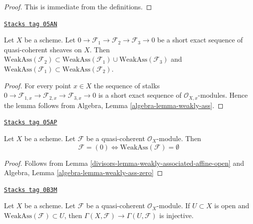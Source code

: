 \begin{proof}
This is immediate from the definitions.
\end{proof}

\begin{lemma}
\label{divisors-lemma-ses-weakly-ass}
\href{https://stacks.math.columbia.edu/tag/05AN}{\texttt{Stacks tag 05AN}}

Let $X$ be a scheme.
Let $0 \to \mathcal{F}_1 \to \mathcal{F}_2 \to \mathcal{F}_3 \to 0$
be a short exact sequence of quasi-coherent sheaves on $X$.
Then
$\text{WeakAss}(\mathcal{F}_2) \subset
\text{WeakAss}(\mathcal{F}_1) \cup \text{WeakAss}(\mathcal{F}_3)$
and
$\text{WeakAss}(\mathcal{F}_1) \subset \text{WeakAss}(\mathcal{F}_2)$.
\end{lemma}

\begin{proof}
For every point $x \in X$ the sequence of stalks
$0 \to \mathcal{F}_{1, x} \to \mathcal{F}_{2, x} \to \mathcal{F}_{3, x} \to 0$
is a short exact sequence of $\mathcal{O}_{X, x}$-modules.
Hence the lemma follows from
Algebra, Lemma \ref{algebra-lemma-weakly-ass}.
\end{proof}

\begin{lemma}
\label{divisors-lemma-weakly-ass-zero}
\href{https://stacks.math.columbia.edu/tag/05AP}{\texttt{Stacks tag 05AP}}

Let $X$ be a scheme.
Let $\mathcal{F}$ be a quasi-coherent $\mathcal{O}_X$-module.
Then
$$
\mathcal{F} = (0) \Leftrightarrow \text{WeakAss}(\mathcal{F}) = \emptyset
$$
\end{lemma}

\begin{proof}

Follows from
Lemma \ref{divisors-lemma-weakly-associated-affine-open}
and
Algebra, Lemma \ref{algebra-lemma-weakly-ass-zero}
\end{proof}

\begin{lemma}
\label{divisors-lemma-restriction-injective-open-contains-weakly-ass}
\href{https://stacks.math.columbia.edu/tag/0B3M}{\texttt{Stacks tag 0B3M}}

Let $X$ be a scheme. Let $\mathcal{F}$ be a quasi-coherent
$\mathcal{O}_X$-module. If $U \subset X$ is open and
$\text{WeakAss}(\mathcal{F}) \subset U$, then
$\Gamma(X, \mathcal{F}) \to \Gamma(U, \mathcal{F})$
is injective.
\end{lemma}

